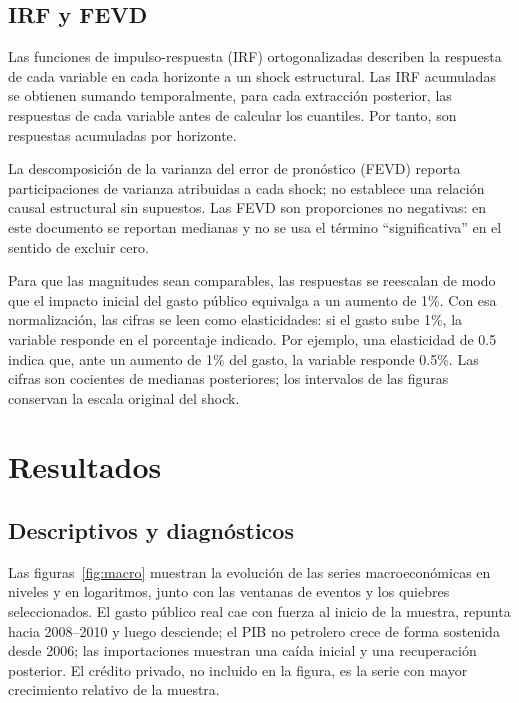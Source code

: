 \documentclass[11pt,a4paper]{article}
\begin{document}
\subsection{IRF y FEVD}
\label{sec:irf}

Las funciones de impulso-respuesta (IRF) ortogonalizadas describen la respuesta
de cada variable en cada horizonte a un shock estructural. Las IRF acumuladas se
obtienen sumando temporalmente, para cada extracción posterior, las respuestas
de cada variable antes de calcular los cuantiles. Por tanto, son respuestas
acumuladas por horizonte.

La descomposición de la varianza del error de pronóstico (FEVD) reporta
participaciones de varianza atribuidas a cada shock; no establece una relación
causal estructural sin supuestos. Las
FEVD son proporciones no negativas: en este documento se reportan medianas y
no se usa el término ``significativa'' en el sentido de excluir cero.

Para que las magnitudes sean comparables, las respuestas se reescalan de modo
que el impacto inicial del gasto público equivalga a un aumento de 1\%. Con esa
normalización, las cifras se leen como elasticidades: si el gasto sube 1\%, la
variable responde en el porcentaje indicado. Por ejemplo, una elasticidad de 0.5
indica que, ante un aumento de 1\% del gasto, la variable responde 0.5\%. Las
cifras son cocientes de medianas posteriores; los intervalos de las figuras
conservan la escala original del shock.

\section{Resultados}
\label{sec:resultados}

\subsection{Descriptivos y diagnósticos}
\label{sec:diag}

Las figuras~\ref{fig:macro} muestran la evolución de las series
macroeconómicas en niveles y en logaritmos, junto con las ventanas de eventos
y los quiebres seleccionados. El gasto público real cae con fuerza al inicio
de la muestra, repunta hacia 2008--2010 y luego desciende; el PIB no petrolero
crece de forma sostenida desde 2006; las importaciones muestran una caída
inicial y una recuperación posterior. El crédito privado, no incluido en
la figura, es la serie con mayor crecimiento relativo de la muestra.
\end{document}
